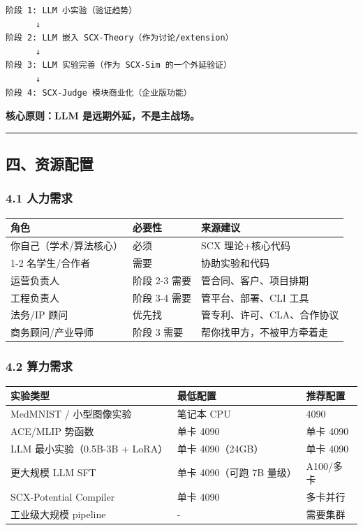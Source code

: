 \documentclass[
  12pt,
]{ctexart}
\begin{document}
\begin{verbatim}
阶段 1: LLM 小实验（验证趋势）
      ↓
阶段 2: LLM 嵌入 SCX-Theory（作为讨论/extension）
      ↓
阶段 3: LLM 实验完善（作为 SCX-Sim 的一个外延验证）
      ↓
阶段 4: SCX-Judge 模块商业化（企业版功能）
\end{verbatim}

\textbf{核心原则：LLM 是远期外延，不是主战场。}

\begin{center}\rule{0.5\linewidth}{0.5pt}\end{center}

\subsection{四、资源配置}\label{ux56dbux8d44ux6e90ux914dux7f6e}

\subsubsection{4.1 人力需求}\label{ux4ebaux529bux9700ux6c42}

\begin{longtable}[]{@{}lll@{}}
\toprule\noalign{}
角色 & 必要性 & 来源建议 \\
\midrule\noalign{}
\endhead
\bottomrule\noalign{}
\endlastfoot
你自己（学术/算法核心） & 必须 & SCX 理论+核心代码 \\
1-2 名学生/合作者 & 需要 & 协助实验和代码 \\
运营负责人 & 阶段 2-3 需要 & 管合同、客户、项目排期 \\
工程负责人 & 阶段 3-4 需要 & 管平台、部署、CLI 工具 \\
法务/IP 顾问 & 优先找 & 管专利、许可、CLA、合作协议 \\
商务顾问/产业导师 & 阶段 3 需要 & 帮你找甲方，不被甲方牵着走 \\
\end{longtable}

\subsubsection{4.2 算力需求}\label{ux7b97ux529bux9700ux6c42}

\begin{longtable}[]{@{}lll@{}}
\toprule\noalign{}
实验类型 & 最低配置 & 推荐配置 \\
\midrule\noalign{}
\endhead
\bottomrule\noalign{}
\endlastfoot
MedMNIST / 小型图像实验 & 笔记本 CPU & 4090 \\
ACE/MLIP 势函数 & 单卡 4090 & 单卡 4090 \\
LLM 最小实验（0.5B-3B + LoRA） & 单卡 4090（24GB） & 单卡 4090 \\
更大规模 LLM SFT & 单卡 4090（可跑 7B 量级） & A100/多卡 \\
SCX-Potential Compiler & 单卡 4090 & 多卡并行 \\
工业级大规模 pipeline & - & 需要集群 \\
\end{longtable}
\end{document}
